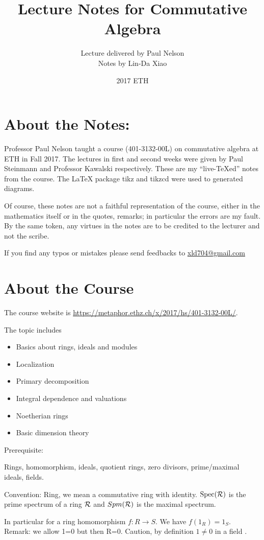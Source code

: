 \documentclass[11pt]{article}
\title{\bf Lecture Notes for Commutative Algebra}
\author{Lecture delivered by Paul Nelson\\
Notes by Lin-Da Xiao}
\date{2017 ETH} %
\newcommand{\calr}{{\cal R}}
\begin{document}
\maketitle
\tableofcontents
\newpage

\section*{About the Notes:}
Professor Paul Nelson taught a course (401-3132-00L) on commutative algebra at ETH in Fall 2017. The lectures in first and second weeks were given by Paul Steinmann and Professor Kawalski respectively. These are my ``live-\TeX ed'' notes from the course. The {\LaTeX } package tikz and tikzcd were used to generated diagrams. 

Of course, these notes are not a faithful representation of the course, either in the mathematics itself or in the quotes, remarks; in particular the errors are my fault. By the same token, any virtues in the notes are to be credited to the lecturer and not the scribe.

If you find any typos or mistakes please send feedbacks to \href{mailto:xld704@gmail.com}{xld704@gmail.com}
\section*{About the Course}
The course website is \href{https://metaphor.ethz.ch/x/2017/hs/401-3132-00L/}{https://metaphor.ethz.ch/x/2017/hs/401-3132-00L/}. 

The topic includes
\begin{itemize}
\item 
Basics about rings, ideals and modules
\item 
Localization
\item 
Primary decomposition
\item 
Integral dependence and valuations
\item 
Noetherian rings
\item 
Basic dimension theory
\end{itemize}
Prerequisite:

Rings, homomorphism, ideals, quotient rings, zero divisors, prime/maximal ideals, fields.

Convention: 
Ring, we mean a commutative ring with identity. $\text{Spec}(\calr)$ is the prime spectrum of a ring $\calr$ and $Spm(\calr)$ is the maximal spectrum.

In particular for a ring homomorphism $f:R\rightarrow S$. We have $f(1_R)=1_S$.
 
Remark:
we allow 1=0 but then R=0.
Caution, by definition $1\neq 0$ in a field .
\end{document}
